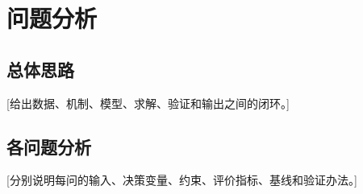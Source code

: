 \section{问题分析}
\subsection{总体思路}
[给出数据、机制、模型、求解、验证和输出之间的闭环。]
\subsection{各问题分析}
[分别说明每问的输入、决策变量、约束、评价指标、基线和验证办法。]
